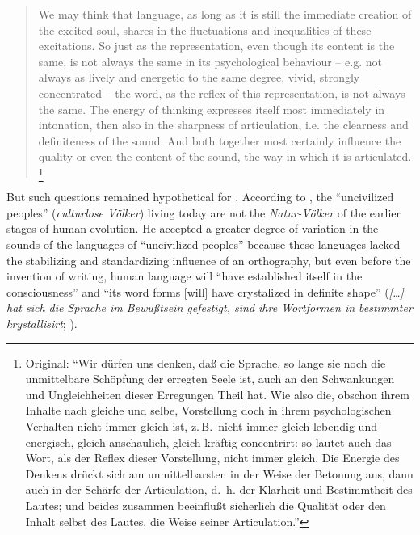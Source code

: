 \documentclass[output=paper]{langscibook}
\begin{document}
\begin{quotation}
We may think that language, as long as it is still the immediate creation of the excited soul, shares in the fluctuations and inequalities of these excitations. So just as the representation, even though its content is the same, is not always the same in its psychological behaviour -- e.g. not always as lively and energetic to the same degree, vivid, strongly concentrated -- the word, as the reflex of this representation, is not always the same. The energy of thinking expresses itself most immediately in intonation, then also in the sharpness of articulation, i.e. the clearness and definiteness of the sound. And both together most certainly influence the quality or even the content of the sound, the way in which it is articulated. \citep[3--4]{Steinthal1867}\footnote{Original: ``Wir dürfen uns denken, daß die Sprache, so lange sie noch die unmittelbare Schöpfung der erregten Seele ist, auch an den Schwankungen und Ungleichheiten dieser Erregungen Theil hat. Wie also die, obschon ihrem Inhalte nach gleiche und selbe, Vorstellung doch in ihrem psychologischen Verhalten nicht immer gleich ist, z.\,B.\ nicht immer gleich lebendig und energisch, gleich anschaulich, gleich kräftig concentrirt: so lautet auch das Wort, als der Reflex dieser Vorstellung, nicht immer gleich. Die Energie des Denkens drückt sich am unmittelbarsten in der Weise der Betonung aus, dann auch in der Schärfe der Articulation, d.~h. der Klarheit und Bestimmtheit des Lautes; und beides zusammen beeinflußt sicherlich die Qualität oder den Inhalt selbst des Lautes, die Weise seiner Articulation.''}
\end{quotation}

But such questions remained hypothetical for {\Steinthal}. According to \citet[3--4]{Steinthal1867}, the ``uncivilized peoples'' (\emph{culturlose Völker}) living today are not the \emph{Natur-Völker} of the earlier stages of human evolution. He accepted a greater degree of variation in the sounds of the languages of ``uncivilized peoples'' because these languages lacked the stabilizing and standardizing influence of an orthography, but even before the invention of writing, human language will ``have established itself in the consciousness'' and ``its word forms [will] have crystalized in definite shape'' (\emph{[…] hat sich die Sprache im Bewußtsein gefestigt, sind ihre Wortformen in bestimmter  krystallisirt}; \citealt[4--5]{Steinthal1867}). 
\end{document}
